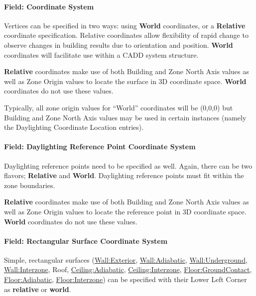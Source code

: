\paragraph{Field: Coordinate System}\label{field-coordinate-system}

Vertices can be specified in two ways: using \textbf{World} coordinates, or a \textbf{Relative} coordinate specification. Relative coordinates allow flexibility of rapid change to observe changes in building results due to orientation and position. \textbf{World} coordinates will facilitate use within a CADD system structure.

\textbf{Relative} coordinates make use of both Building and Zone North Axis values as well as Zone Origin values to locate the surface in 3D coordinate space. \textbf{World} coordinates do not use these values.

Typically, all zone origin values for ``World'' coordinates will be (0,0,0) but Building and Zone North Axis values may be used in certain instances (namely the Daylighting Coordinate Location entries).

\paragraph{Field: Daylighting Reference Point Coordinate System}\label{field-daylighting-reference-point-coordinate-system}

Daylighting reference points need to be specified as well. Again, there can be two flavors; \textbf{Relative} and \textbf{World}. Daylighting reference points must fit within the zone boundaries.

\textbf{Relative} coordinates make use of both Building and Zone North Axis values as well as Zone Origin values to locate the reference point in 3D coordinate space. \textbf{World} coordinates do not use these values.

\paragraph{Field: Rectangular Surface Coordinate System}\label{field-rectangular-surface-coordinate-system}

Simple, rectangular surfaces (\hyperref[wallexterior]{Wall:Exterior}, \hyperref[walladiabatic]{Wall:Adiabatic}, \hyperref[wallunderground]{Wall:Underground}, \hyperref[wallinterzone]{Wall:Interzone}, Roof, \hyperref[ceilingadiabatic]{Ceiling:Adiabatic}, \hyperref[ceilinginterzone]{Ceiling:Interzone}, \hyperref[floorgroundcontact]{Floor:GroundContact}, \hyperref[flooradiabatic]{Floor:Adiabatic}, \hyperref[floorinterzone]{Floor:Interzone}) can be specified with their Lower Left Corner as \textbf{relative} or \textbf{world}.

